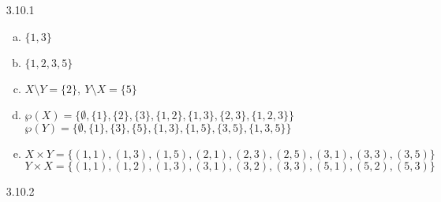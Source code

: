 	\begin{itemize}

	\item[3.10.1]
	
	\begin{enumerate}[(a)]
		    \item $\{1,3\}$
 		   \item $\{1,2,3,5\}$
 		   \item $X\setminus Y = \{2\},\ Y\setminus X = \{5\}$
   		 \item $\wp(X) = \{\emptyset,\{1\},\{2\},\{3\}, \{1,2\},\{1,3\},\{2,3\},\{1,2,3\}\}$\\$\wp(Y)=\{\emptyset,\{1\},\{3\},\{5\}, \{1,3\},\{1,5\},\{3,5\},\{1,3,5\}\} $
   		 \item $X \times Y = \{(1,1),(1,3),(1,5),(2,1),(2,3),(2,5),(3,1),(3,3),(3,5)\}$\\$Y \times X = \{(1,1),(1,2),(1,3),(3,1),(3,2),(3,3),(5,1),(5,2),(5,3)\}$
		\end{enumerate}

      \item[3.10.2]

        \begin{enumerate}[(a)]


\end{enumerate}
\end{itemize}
